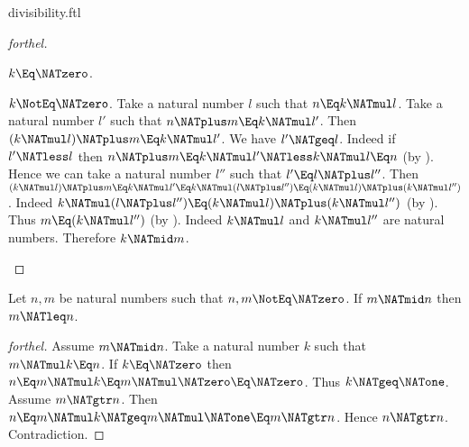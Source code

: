 \documentclass{stex}
\begin{document}
\begin{smodule}{divisibility.ftl}
\begin{proof}[forthel]
  \begin{case}{$k \Eq \NATzero$.} \end{case}

  \begin{case}{$k \NotEq \NATzero$.}
    Take a natural number $l$ such that $n \Eq k \NATmul l$.
    Take a natural number $l'$ such that $n \NATplus m \Eq k \NATmul l'$.
    Then $(k \NATmul l) \NATplus m \Eq k \NATmul l'$.
    We have $l' \NATgeq l$.
    Indeed if $l' \NATless l$ then
    $n \NATplus m
      \Eq k \NATmul l'
      \NATless k \NATmul l
      \Eq n$ (by ).
    Hence we can take a natural number $l''$ such that $l' \Eq l \NATplus l''$.
    Then $(k \NATmul l) \NATplus m
      \Eq k \NATmul l'
      \Eq k \NATmul (l \NATplus l'')
      \Eq (k \NATmul l) \NATplus (k \NATmul l'')$.
    Indeed $k \NATmul (l \NATplus l'') \Eq (k \NATmul l) \NATplus (k \NATmul l'')$ (by ).
    Thus $m \Eq (k \NATmul l'')$ (by ).
    Indeed $k \NATmul l$ and $k \NATmul l''$ are natural numbers.
    Therefore $k \NATmid m$.
  \end{case}
\end{proof}

\begin{proposition}[forthel,id=ARITHMETIC_07_2187144577679360]
  Let $n, m$ be natural numbers such that $n, m \NotEq \NATzero$.
  If $m \NATmid n$ then $m \NATleq n$.
\end{proposition}
\begin{proof}[forthel]
  Assume $m \NATmid n$.
  Take a natural number $k$ such that $m \NATmul k \Eq n$.
  If $k \Eq \NATzero$ then
  $n
    \Eq m \NATmul k
    \Eq m \NATmul \NATzero
    \Eq \NATzero$.
  Thus $k \NATgeq \NATone$.
  Assume $m \NATgtr n$.
  Then $n
    \Eq m \NATmul k
    \NATgeq m \NATmul \NATone
    \Eq m
    \NATgtr n$.
  Hence $n \NATgtr n$.
  Contradiction.
\end{proof}
\end{smodule}
\end{document}
